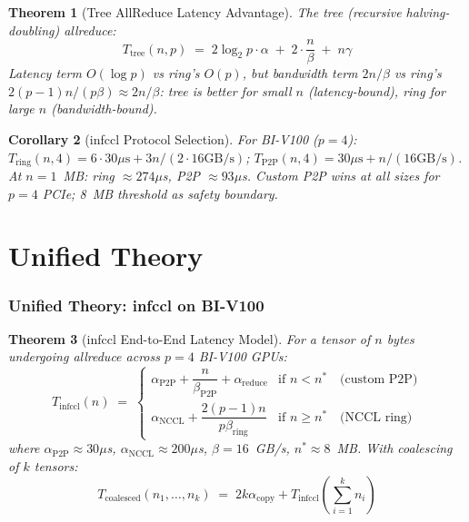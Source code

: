 \documentclass[11pt,a4paper,twoside]{article}
\theoremstyle{plain}
\newtheorem{theorem}{Theorem}[section]
\newtheorem{corollary}[theorem]{Corollary}
\theoremstyle{definition}
\theoremstyle{remark}
\begin{document}
\begin{theorem}[Tree AllReduce Latency Advantage]
\label{thm:tree}
The tree (recursive halving-doubling) allreduce:
\begin{equation}
  T_{\text{tree}}(n, p) \;=\; 2\log_2 p \cdot \alpha \;+\;
  2 \cdot \frac{n}{\beta} \;+\; n\gamma
\end{equation}
Latency term $O(\log p)$ vs ring's $O(p)$, but bandwidth term $2n/\beta$ vs
ring's $2(p-1)n/(p\beta) \approx 2n/\beta$: tree is better for small $n$
(latency-bound), ring for large $n$ (bandwidth-bound).
\end{theorem}

\begin{corollary}[infccl Protocol Selection]
For BI-V100 ($p=4$):
$T_{\text{ring}}(n, 4) = 6 \cdot 30\mu\text{s} + 3n/(2 \cdot 16\text{GB/s})$;
$T_{\text{P2P}}(n, 4) = 30\mu\text{s} + n/(16\text{GB/s})$.
At $n = 1$~MB: ring $\approx 274\mu$s, P2P $\approx 93\mu$s.
Custom P2P wins at all sizes for $p=4$ PCIe; 8~MB threshold as safety boundary.
\end{corollary}



\part{Unified Theory}

\section{Unified Theory: infccl on BI-V100}
\label{sec:unified}

\begin{theorem}[infccl End-to-End Latency Model]
\label{thm:infccl-e2e}
For a tensor of $n$ bytes undergoing allreduce across $p=4$ BI-V100 GPUs:
\begin{equation}
\boxed{
  T_{\text{infccl}}(n) \;=\;
  \begin{cases}
    \alpha_{\text{P2P}} + \dfrac{n}{\beta_{\text{P2P}}}
    + \alpha_{\text{reduce}}
    & \text{if } n < n^* \quad\text{(custom P2P)}\\[8pt]
    \alpha_{\text{NCCL}} + \dfrac{2(p-1)n}{p\beta_{\text{ring}}}
    & \text{if } n \geq n^* \quad\text{(NCCL ring)}
  \end{cases}
}
\label{eq:infccl-model}
\end{equation}
where $\alpha_{\text{P2P}} \approx 30\mu$s, $\alpha_{\text{NCCL}} \approx 200\mu$s,
$\beta = 16$~GB/s, $n^* \approx 8$~MB.
With coalescing of $k$ tensors:
\begin{equation}
  T_{\text{coalesced}}(n_1,\ldots,n_k) \;=\;
  2k\alpha_{\text{copy}} + T_{\text{infccl}}\!\left(\sum_{i=1}^k n_i\right)
\end{equation}
\end{theorem}
\end{document}
